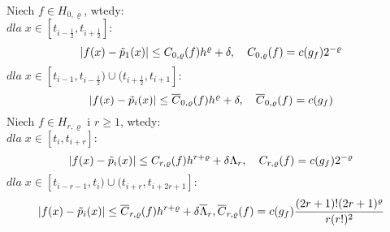 \documentclass[oik, pdftex, robocza, man]{mgrwms}
\begin{document}
    \begin{lemma}
        Niech $f \in H_{0, \varrho}$, wtedy: \\
        $dla \; x \in [t_{i-\frac{1}{2}}, t_{i + \frac{1}{2}}] :$
        \begin{equation*}
            |f(x) - \tilde{p}_{1}(x)| \leq C_{0, \varrho}(f) h^{\varrho} + \delta, \quad C_{0, \varrho}(f) = c(g_{f}) 2^{-\varrho} \\
        \end{equation*}
        $dla \; x \in [t_{i-1}, t_{i - \frac{1}{2}}) \cup (t_{i + \frac{1}{2}}, t_{i+1}]  :$
        \begin{equation*}
            |f(x) - \tilde{p}_{i}(x)| \leq \overline{C} _{0, \varrho}(f) h^{\varrho}  + \delta, \quad \overline{C} _{0, \varrho}(f) = c(g_{f}) \\
        \end{equation*}
        Niech $f \in H_{r, \varrho}$ i $r \geq 1$, wtedy: \\
        $dla \; x \in [t_{i}, t_{i + r}] : $
        \begin{equation*}
            |f(x) - \tilde{p}_{i}(x)| \leq C_{r, \varrho}(f) h^{r+\varrho} + \delta\Lambda_{r}, \quad C_{r, \varrho}(f) = c(g_{f}) 2^{-\varrho} \\
        \end{equation*}
        $dla \; x \in [t_{i-r-1}, t_{i}) \cup (t_{i + r}, t_{i+2r+1}]  :$
        \begin{equation*}
            |f(x) - \tilde{p}_{i}(x)| \leq \overline{C} _{r, \varrho}(f) h^{r+\varrho} + \delta\overline{\Lambda}_{r}, \overline{C} _{r, \varrho}(f) = c(g_{f}) \frac{(2r+1)!(2r+1)^{\varrho}}{r(r!)^{2}} \\
        \end{equation*}
    \end{lemma}
\end{document}
